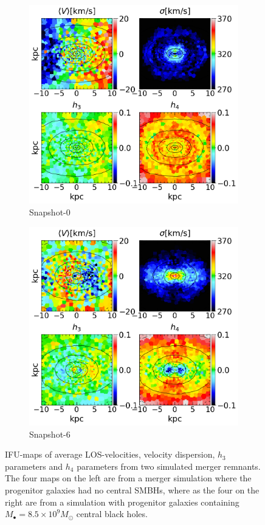 \documentclass[english, oneside]{HYgradu}
\begin{document}
\begin{figure}
	\centering
	\begin{subfigure}[b]{0.49\textwidth}
		\includegraphics[width=\textwidth]{BH_0.png}
		\caption{Snapshot-0}
	\end{subfigure}
	\begin{subfigure}[b]{0.49\textwidth}
		\includegraphics[width=\textwidth]{BH_6.png}
		\caption{Snapshot-6}
	\end{subfigure}
	\caption{IFU-maps of average LOS-velocities, velocity dispersion, $h_3$ parameters and $h_4$ parameters from two simulated merger remnants. The four maps on the left are from a merger simulation where the progenitor galaxies had no central SMBHs, where as the four on the right are from a simulation with progenitor galaxies containing $M_\bullet = 8.5 \times 10^9 M_\odot$ central black holes.}
	\label{figure:snapshot_0_and_1_IFU}
\end{figure}
\end{document}

